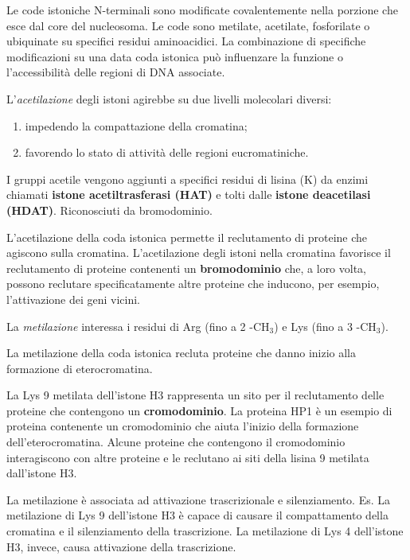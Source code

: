 \documentclass[]{article}
\begin{document}
Le code istoniche N-terminali sono modificate covalentemente nella
porzione che esce dal core del nucleosoma. Le code sono metilate,
acetilate, fosforilate o ubiquinate su specifici residui aminoacidici.
La combinazione di specifiche modificazioni su una data coda istonica
può influenzare la funzione o l'accessibilità delle regioni di DNA
associate.

L'\emph{acetilazione} degli istoni agirebbe su due livelli molecolari
diversi:

\begin{enumerate}
\def\labelenumi{\arabic{enumi}.}
\itemsep1pt\parskip0pt
\item
  impedendo la compattazione della cromatina;
\item
  favorendo lo stato di attività delle regioni eucromatiniche.
\end{enumerate}

I gruppi acetile vengono aggiunti a specifici residui di lisina (K) da
enzimi chiamati \textbf{istone acetiltrasferasi (HAT)} e tolti dalle
\textbf{istone deacetilasi (HDAT)}. Riconosciuti da bromodominio.

L'acetilazione della coda istonica permette il reclutamento di proteine
che agiscono sulla cromatina. L'acetilazione degli istoni nella
cromatina favorisce il reclutamento di proteine contenenti un
\textbf{bromodominio} che, a loro volta, possono reclutare
specificatamente altre proteine che inducono, per esempio, l'attivazione
dei geni vicini.

La \emph{metilazione} interessa i residui di Arg (fino a 2 -CH\(_3\)) e
Lys (fino a 3 -CH\(_3\)).

La metilazione della coda istonica recluta proteine che danno inizio
alla formazione di eterocromatina.

La Lys 9 metilata dell'istone H3 rappresenta un sito per il reclutamento
delle proteine che contengono un \textbf{cromodominio}. La proteina HP1
è un esempio di proteina contenente un cromodominio che aiuta l'inizio
della formazione dell'eterocromatina. Alcune proteine che contengono il
cromodominio interagiscono con altre proteine e le reclutano ai siti
della lisina 9 metilata dall'istone H3.

La metilazione è associata ad attivazione trascrizionale e
silenziamento. Es. La metilazione di Lys 9 dell'istone H3 è capace di
causare il compattamento della cromatina e il silenziamento della
trascrizione. La metilazione di Lys 4 dell'istone H3, invece, causa
attivazione della trascrizione.
\end{document}

